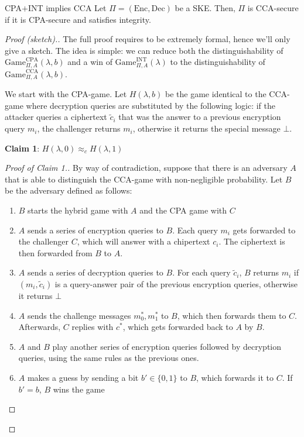 \documentclass[a4paper, 12pt]{report}
\begin{document}
    \begin{framedthm}{CPA$+$INT implies CCA}
        Let $\Pi = (\mathrm{Enc}, \mathrm{Dec})$ be a SKE. Then, $\Pi$ is CCA-secure if it is CPA-secure and satisfies integrity.
    \end{framedthm}

    \begin{proof}[Proof (sketch).]
        The full proof requires to be extremely formal, hence we'll only give a sketch. The idea is simple: we can reduce both the distinguishability of $\mathrm{Game}_{\Pi, A}^{\text{CPA}}(\lambda,b)$ and a win of $\mathrm{Game}_{\Pi,A}^{\text{INT}}(\lambda)$ to the distinguishability of $\mathrm{Game}_{\Pi, A}^{\text{CCA}}(\lambda,b)$.
        
        We start with the CPA-game. Let $H(\lambda,b)$ be the game identical to the CCA-game where decryption queries are substituted by the following logic: if the attacker queries a ciphertext $\widetilde c_i$ that was the answer to a previous encryption query $m_i$, the challenger returns $m_i$, otherwise it returns the special message $\bot$.
        
        \textbf{Claim 1}: $H(\lambda, 0) \approx_c H(\lambda,1)$

        \begin{proof}[Proof of Claim 1.]
            By way of contradiction, suppose that there is an adversary $A$ that is able to distinguish the CCA-game with non-negligible probability. Let $B$ be the adversary defined as follows:
            \begin{enumerate}
                \item $B$ starts the hybrid game with $A$ and the CPA game with $C$
                \item $A$ sends a series of encryption queries to $B$. Each query $m_i$ gets forwarded to the challenger $C$, which will answer with a chipertext $c_i$. The ciphertext is then forwarded from $B$ to $A$.
                \item $A$ sends a series of decryption queries to $B$. For each query $\widetilde c_i$, $B$ returns $m_i$ if $(m_i, \widetilde c_i)$ is a query-answer pair of the previous encryption queries, otherwise it returns $\bot$
                \item $A$ sends the challenge messages $m_0^*, m_1^*$ to $B$, which then forwards them to $C$. Afterwards, $C$ replies with $c^*$, which gets forwarded back to $A$ by $B$.
                \item $A$ and $B$ play another series of encryption queries followed by decryption queries, using the same rules as the previous ones.
                \item $A$ makes a guess by sending a bit $b' \in \{0,1\}$ to $B$, which forwards it to $C$. If $b' = b$, $B$ wins the game
            \end{enumerate}


\end{proof}
\end{proof}
\end{document}
